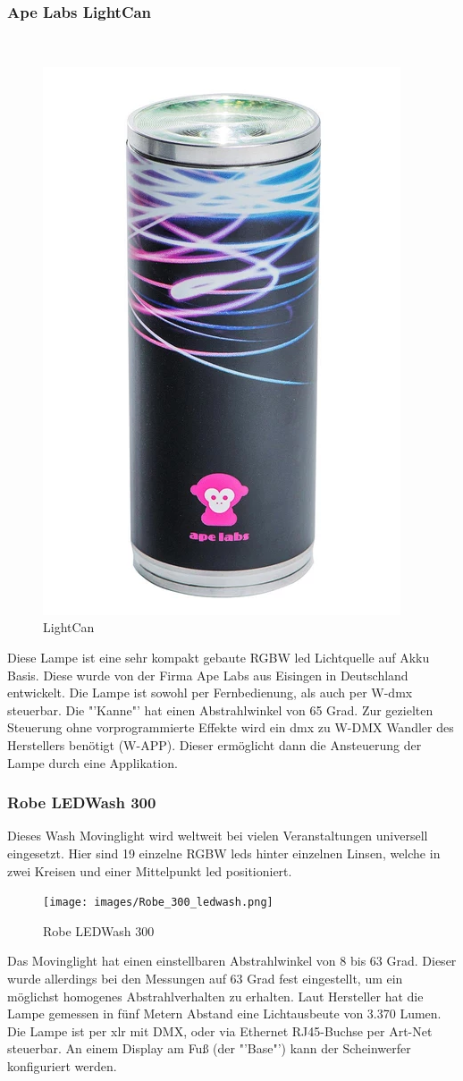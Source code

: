 \documentclass[11pt]{scrartcl}
\begin{document}
\subsubsection{Ape Labs LightCan}
~\par\vspace{-\baselineskip}
\begin{figure}
    \vspace{-45pt}
    \begin{center}
        \includegraphics[width=.23\textwidth]{images/light_can_front.png}
    \end{center}
    \vspace{-20pt}
    \begin{center}
        \caption[LightCan]{LightCan\\\cite{lightCan}}
    \end{center}
    \vspace{-15pt}
\end{figure}
\noindent
Diese Lampe ist eine sehr kompakt gebaute RGBW \ac{led} Lichtquelle auf Akku Basis. Diese wurde von der Firma Ape Labs aus Eisingen in
Deutschland entwickelt. Die Lampe ist sowohl per Fernbedienung, als auch per W-\ac{dmx} steuerbar.
Die "'Kanne"' hat einen Abstrahlwinkel von 65 Grad. Zur gezielten Steuerung ohne vorprogrammierte Effekte wird ein \ac{dmx} zu W-DMX
Wandler des Herstellers benötigt (W-APP). Dieser ermöglicht dann die Ansteuerung der Lampe durch eine Applikation.
\subsubsection{Robe LEDWash 300}
Dieses Wash Movinglight wird weltweit bei vielen Veranstaltungen universell eingesetzt. Hier sind 19 einzelne
RGBW \ac{led}s hinter einzelnen Linsen, welche in zwei Kreisen und einer Mittelpunkt \ac{led} positioniert.
\begin{figure}[H]
    \begin{center}
        \texttt{[image: images/Robe\_300\_ledwash.png]}
    \end{center}
    \caption[Robe LEDWash 300]{Robe LEDWash 300 \cite{robe}}
\end{figure}
\noindent
Das Movinglight hat einen einstellbaren Abstrahlwinkel von 8 bis 63 Grad. Dieser wurde allerdings bei den Messungen auf 63 Grad fest
eingestellt, um ein möglichst homogenes Abstrahlverhalten zu erhalten. Laut Hersteller hat die Lampe gemessen in fünf Metern Abstand eine
Lichtausbeute von 3.370 Lumen. Die Lampe ist per \ac{xlr} mit DMX, oder via Ethernet RJ45-Buchse per Art-Net steuerbar. An einem
Display am Fuß (der "'Base"') kann der Scheinwerfer konfiguriert werden.
\end{document}
